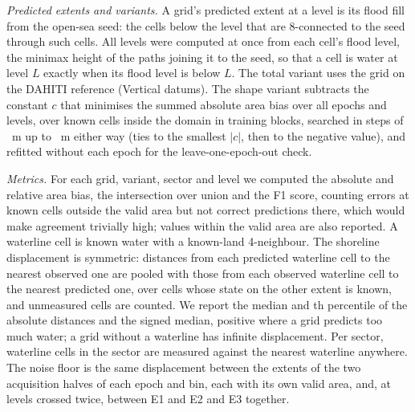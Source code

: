 \emph{Predicted extents and variants.} A grid's predicted extent at a level is its flood fill from the open-sea seed: the cells below the level that are 8-connected to the seed through such cells. All levels were computed at once from each cell's flood level, the minimax height of the paths joining it to the seed, so that a cell is water at level $L$ exactly when its flood level is below $L$. The total variant uses the grid on the DAHITI reference (Vertical datums). The shape variant subtracts the constant $c$ that minimises the summed absolute area bias over all epochs and levels, over known cells inside the domain in training blocks, searched in steps of ~m up to ~m either way (ties to the smallest $|c|$, then to the negative value), and refitted without each epoch for the leave-one-epoch-out check.

\emph{Metrics.} For each grid, variant, sector and level we computed the absolute and relative area bias, the intersection over union and the F1 score, counting errors at known cells outside the valid area but not correct predictions there, which would make agreement trivially high; values within the valid area are also reported. A waterline cell is known water with a known-land 4-neighbour. The shoreline displacement is symmetric: distances from each predicted waterline cell to the nearest observed one are pooled with those from each observed waterline cell to the nearest predicted one, over cells whose state on the other extent is known, and unmeasured cells are counted. We report the median and th percentile of the absolute distances and the signed median, positive where a grid predicts too much water; a grid without a waterline has infinite displacement. Per sector, waterline cells in the sector are measured against the nearest waterline anywhere. The noise floor is the same displacement between the extents of the two acquisition halves of each epoch and bin, each with its own valid area, and, at levels crossed twice, between E1 and E2 and E3 together.

